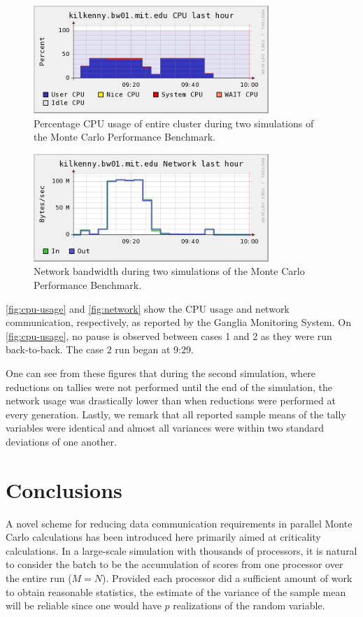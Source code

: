 \begin{figure}[ht]
  \centering
  \includegraphics[width=3.5in]{figures/ch4/cpu_usage.png}
  \caption{Percentage CPU usage of entire cluster during two simulations of the
    Monte Carlo Performance Benchmark.}
  \label{fig:cpu-usage}
\end{figure}
\begin{figure}[ht]
  \centering
  \includegraphics[width=3.5in]{figures/ch4/network.png}
  \caption{Network bandwidth during two simulations of the Monte Carlo
    Performance Benchmark.}
  \label{fig:network}
\end{figure}
\autoref{fig:cpu-usage} and \autoref{fig:network} show the CPU usage and network
communication, respectively, as reported by the Ganglia Monitoring System. On
\autoref{fig:cpu-usage}, no pause is observed between cases 1 and 2 as they were
run back-to-back. The case 2 run began at 9:29.

One can see from these figures that during the second simulation, where
reductions on tallies were not performed until the end of the simulation, the
network usage was drastically lower than when reductions were performed at every
generation. Lastly, we remark that all reported sample means of the tally
variables were identical and almost all variances were within two standard
deviations of one another.

\section{Conclusions}

A novel scheme for reducing data communication requirements in parallel Monte
Carlo calculations has been introduced here primarily aimed at criticality
calculations. In a large-scale simulation with thousands of processors, it is
natural to consider the batch to be the accumulation of scores from one
processor over the entire run ($M = N$). Provided each processor did a
sufficient amount of work to obtain reasonable statistics, the estimate of the
variance of the sample mean will be reliable since one would have $p$
realizations of the random variable.

